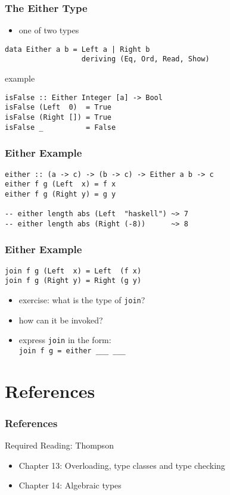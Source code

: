 \documentclass[dvipsnames]{beamer}
\theoremstyle{plain}
\begin{document}
\begin{frame}[fragile]
  \frametitle{The Either Type}

  \begin{itemize}
    \item one of two types
  \end{itemize}

  \begin{lstlisting}
data Either a b = Left a | Right b
                  deriving (Eq, Ord, Read, Show)
  \end{lstlisting}

  \begin{exampleblock}{example}
    \begin{lstlisting}
isFalse :: Either Integer [a] -> Bool
isFalse (Left  0)  = True
isFalse (Right []) = True
isFalse _          = False
    \end{lstlisting}
  \end{exampleblock}
\end{frame}

\begin{frame}[fragile]
  \frametitle{Either Example}

  \begin{lstlisting}
either :: (a -> c) -> (b -> c) -> Either a b -> c
either f g (Left  x) = f x
either f g (Right y) = g y

-- either length abs (Left  "haskell") ~> 7
-- either length abs (Right (-8))      ~> 8
  \end{lstlisting}
\end{frame}

\begin{frame}[fragile]
  \frametitle{Either Example}

  \begin{lstlisting}
join f g (Left  x) = Left  (f x)
join f g (Right y) = Right (g y)
  \end{lstlisting}

  \medskip
  \begin{itemize}
    \item exercise: what is the type of \lstinline|join|?
    \item how can it be invoked?
    \item express \lstinline|join| in the form:\\
      \lstinline|join f g = either ___ ___|
  \end{itemize}
\end{frame}

\section*{References}

\begin{frame}
  \frametitle{References}

  \begin{block}{Required Reading: Thompson}
    \begin{itemize}
      \item Chapter 13: \alert{Overloading, type classes and type checking}
      \item Chapter 14: \alert{Algebraic types}
    \end{itemize}
  \end{block}
\end{frame}
\end{document}
